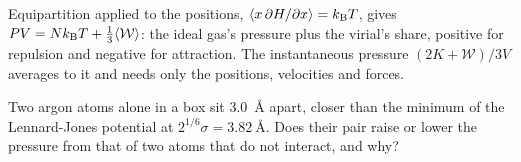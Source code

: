 \begin{keyidea}
Equipartition applied to the positions, $\langle x\,\partial H/\partial x \rangle
= k_{\mathrm{B}} T$, gives $PV = Nk_{\mathrm{B}} T + \frac13\langle \mathcal{W} \rangle$: the ideal gas's
pressure plus the virial's share, positive for repulsion and negative for
attraction. The instantaneous pressure $(2K + \mathcal{W})/3V$ averages
to it and needs only the positions, velocities and forces.
\end{keyidea}

\begin{selfcheck}
Two argon atoms alone in a box sit \SI{3.0}{\angstrom} apart, closer than
the minimum of the Lennard-Jones potential at $2^{1/6}\sigma =
\SI{3.82}{\angstrom}$. Does their pair raise or lower the pressure from
that of two atoms that do not interact, and why?
\end{selfcheck}
